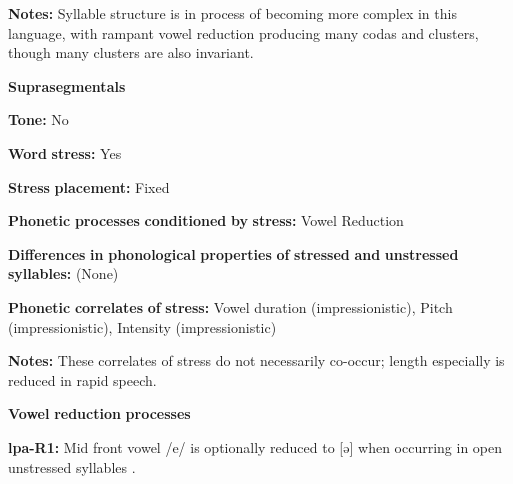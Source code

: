 \begin{styleBody}
\textbf{Notes:} Syllable structure is in process of becoming more complex in this language, with rampant vowel reduction producing many codas and clusters, though many clusters are also invariant.
\end{styleBody}

\begin{styleBody}
\textbf{Suprasegmentals}
\end{styleBody}

\begin{styleBody}
\textbf{Tone:} No
\end{styleBody}

\begin{styleBody}
\textbf{Word} \textbf{stress:} Yes
\end{styleBody}

\begin{styleBody}
\textbf{Stress} \textbf{placement:} Fixed
\end{styleBody}

\begin{styleBody}
\textbf{Phonetic} \textbf{processes} \textbf{conditioned} \textbf{by} \textbf{stress:} Vowel Reduction
\end{styleBody}

\begin{styleBody}
\textbf{Differences} \textbf{in} \textbf{phonological} \textbf{properties} \textbf{of} \textbf{stressed} \textbf{and} \textbf{unstressed} \textbf{syllables:} (None)
\end{styleBody}

\begin{styleBody}
\textbf{Phonetic} \textbf{correlates} \textbf{of} \textbf{stress:} Vowel duration (impressionistic), Pitch (impressionistic), Intensity (impressionistic)
\end{styleBody}

\begin{styleBody}
\textbf{Notes:} These correlates of stress do not necessarily co-occur; length especially is reduced in rapid speech.
\end{styleBody}

\begin{styleBody}
\textbf{Vowel} \textbf{reduction} \textbf{processes}
\end{styleBody}

\begin{styleBody}
\textbf{lpa-R1:} Mid front vowel /e/ is optionally reduced to [ə] when occurring in open unstressed syllables \citep[34]{Lacrampe2014}.
\end{styleBody}

